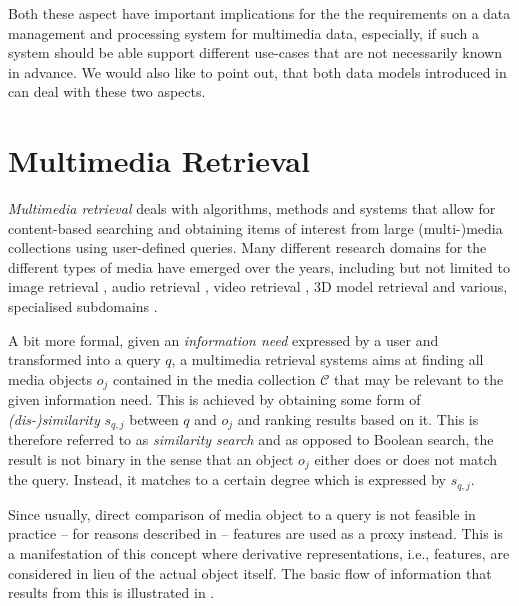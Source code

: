 Both these aspect have important implications for the the requirements on a data management and processing system for multimedia data, especially, if such a system should be able support different use-cases that are not necessarily known in advance. We would also like to point out, that both data models introduced in  can deal with these two aspects.

\section{Multimedia Retrieval}
\label{section:multimedia_retrieval}

\emph{Multimedia retrieval} deals with algorithms, methods and systems that allow for content-based searching and obtaining items of interest from large (multi-)media collections using user-defined queries. Many different research domains for the different types of media have emerged over the years, including but not limited to image retrieval \cite{Dharani:2013Survey}, audio retrieval \cite{Lu:2001Indexing}, video retrieval \cite{Hu:2011Survey}, 3D model retrieval \cite{Yang:2007Content} and various, specialised subdomains \cite{Murthy:2018Content}.

A bit more formal, given an \emph{information need} expressed by a user and transformed into a query $q$, a multimedia retrieval systems aims at finding all media objects $o_j$ contained in the media collection $\mathcal{C}$ that may be relevant to the given information need. This is achieved by obtaining some form of \emph{(dis-)similarity} $s_{q,j}$ between $q$ and $o_j$ and ranking results based on it. This is therefore referred to as \emph{similarity search} and as opposed to Boolean search, the result is not binary in the sense that an object $o_j$ either does or does not match the query. Instead, it matches to a certain degree which is expressed by $s_{q,j}$.

Since usually, direct comparison of media object to a query is not feasible in practice -- for reasons described in  -- features are used as a proxy instead. This is a manifestation of this concept where derivative representations, i.e., features, are considered in lieu of the actual object itself. The basic flow of information that results from this is illustrated in . 

